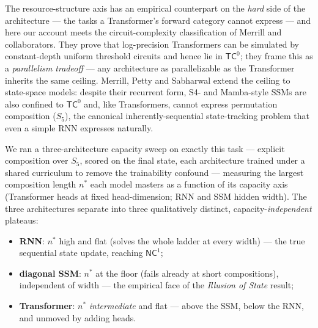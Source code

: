 \documentclass[a4paper,11pt]{article}
\begin{document}
The resource-structure axis has an empirical counterpart on the
\emph{hard} side of the architecture --- the tasks a Transformer's
forward category cannot express --- and here our account meets the
circuit-complexity classification of Merrill and collaborators\cite{merrill2023parallelism}. They prove that log-precision Transformers can be
simulated by constant-depth uniform threshold circuits and hence lie in
\(\mathsf{TC}^0\); they frame this as a \emph{parallelism tradeoff} ---
any architecture as parallelizable as the Transformer inherits the same
ceiling. Merrill, Petty and Sabharwal \cite{merrill2024illusion} extend the ceiling to
state-space models: despite their recurrent form, S4- and Mamba-style SSMs are also confined to \(\mathsf{TC}^0\) and, like Transformers,
cannot express permutation composition (\(S_5\)), the canonical inherently-sequential state-tracking problem that even a simple RNN expresses naturally.

We ran a three-architecture capacity sweep on exactly this task ---
explicit composition over \(S_5\), scored on the final state, each
architecture trained under a shared curriculum to remove the
trainability confound --- measuring the largest composition length
\(n^*\) each model masters as a function of its capacity axis
(Transformer heads at fixed head-dimension; RNN and SSM hidden width).
The three architectures separate into three qualitatively distinct, capacity-\emph{independent} plateaus:

\begin{itemize}
\item
  \textbf{RNN}: \(n^*\) high and flat (solves the whole ladder at every width) --- the true sequential state update, reaching
  \(\mathsf{NC}^1\);
\item
  \textbf{diagonal SSM}: \(n^*\) at the floor (fails already at short compositions), independent of width --- the empirical face of the
  \emph{Illusion of State} result;
\item
  \textbf{Transformer}: \(n^*\) \emph{intermediate} and flat --- above the SSM, below the RNN, and unmoved by adding heads.
\end{itemize}
\end{document}
